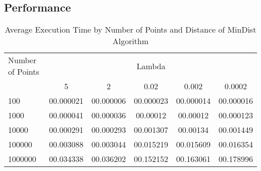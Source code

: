 \subsection{Performance}

\begin{table}[htbp]
    \centering
    \label{tab:execution_time_mindist}
    \begin{tabular}{@{}lccccc@{}}
        \toprule
        Number of Points & \multicolumn{5}{c}{Lambda} \\
        \cmidrule{2-6}
        & 5         & 2       & 0.02        & 0.002       & 0.0002       \\
        \midrule
        100              & 00.000021 & 00.000006 & 00.000023 & 00.000014 & 00.000016 \\
        1000             & 00.000041  & 00.000036 & 00.00012 & 00.00012 & 00.000123 \\
        10000            & 00.000291 & 00.000293 & 00.001307 & 00.00134 & 00.001449 \\
        100000           & 00.003088  & 00.003044  & 00.015219 & 00.015609 & 00.016354 \\
        1000000          & 00.034338 & 00.036202 & 00.152152 & 00.163061 & 00.178996 \\
        \bottomrule
    \end{tabular}
    \caption{Average Execution Time by Number of Points and Distance of MinDist Algorithm}
\end{table}


